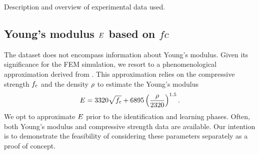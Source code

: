 Description and overview of experimental data used.
\subsection{Young's modulus \texorpdfstring{$E$}{E} based on \texorpdfstring{$fc$}{fc}}
The dataset does not encompass information about Young's modulus. 
Given its significance for  the FEM simulation, we resort to a phenomenological approximation derived from \cite{ACI363}. 
This approximation relies on the compressive strength $f_{\text{c}}$ and the density $\rho$ to estimate the Young's modulus
\begin{align}
	E = 3320 \sqrt{f_{\text{c}}} + 6895 \left( \dfrac{\rho}{2320}\right)^{1.5}.
\end{align}
We opt to approximate $E$ prior to the identification and learning phases. 
Often, both Young's modulus and compressive strength data are available. 
Our intention is to demonstrate the feasibility of considering these parameters separately as a proof of concept.
